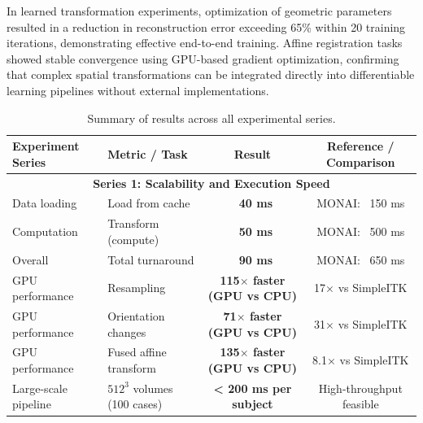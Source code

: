 \documentclass[a4paper,10pt]{elsarticle}
\begin{document}
In learned transformation experiments, optimization of geometric parameters resulted in a reduction in reconstruction error exceeding 65\% within 20 training iterations, demonstrating effective end-to-end training. Affine registration tasks showed stable convergence using GPU-based gradient optimization, confirming that complex spatial transformations can be integrated directly into differentiable learning pipelines without external implementations.


 
\begin{table}[H]
\centering
\caption{Summary of results across all experimental series.}
\label{tab:all_results}
\renewcommand{\arraystretch}{1.2}
\begin{tabular}{|l|l|c|c|}
\hline
\textbf{Experiment Series} & \textbf{Metric / Task} & \textbf{Result} & \textbf{Reference / Comparison} \\
\hline

\multicolumn{4}{|c|}{\textbf{Series 1: Scalability and Execution Speed}} \\
\hline
Data loading & Load from cache & \textbf{~40 ms} & MONAI: ~150 ms \\
Computation & Transform (compute) & \textbf{~50 ms} & MONAI: ~500 ms\\
Overall & Total turnaround & \textbf{~90 ms} & MONAI: ~650 ms\\
GPU performance & Resampling & \textbf{115$\times$ faster (GPU vs CPU)} & 17$\times$ vs SimpleITK \\
GPU performance & Orientation changes & \textbf{71$\times$ faster (GPU vs CPU)} & 31$\times$ vs SimpleITK \\
GPU performance & Fused affine transform & \textbf{135$\times$ faster (GPU vs CPU)} & 8.1$\times$ vs SimpleITK \\
Large-scale pipeline & $512^3$ volumes (100 cases) & \textbf{< 200 ms per subject} & High-throughput feasible \\
\hline


\end{tabular}
\end{table}
\end{document}
